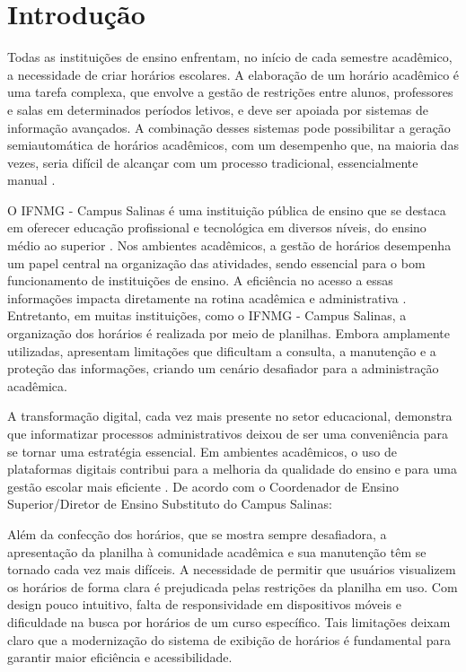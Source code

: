 \chapter{Introdução} 
\label{cap1_introducao} 

Todas as instituições de ensino enfrentam, no início de cada semestre acadêmico, a necessidade de criar horários escolares. A elaboração de um horário acadêmico é uma tarefa complexa, que envolve a gestão de restrições entre alunos, professores e salas em determinados períodos letivos, e deve ser apoiada por sistemas de informação avançados. A combinação desses sistemas pode possibilitar a geração semiautomática de horários acadêmicos, com um desempenho que, na maioria das vezes, seria difícil de alcançar com um processo tradicional, essencialmente manual \cite{passos2016}.

O IFNMG - Campus Salinas é uma instituição pública de ensino que se destaca em oferecer educação profissional e tecnológica em diversos níveis, do ensino médio ao superior \cite{ifnmgsalinas2014}. Nos ambientes acadêmicos, a gestão de horários desempenha um papel central na organização das atividades, sendo essencial para o bom funcionamento de instituições de ensino. A eficiência no acesso a essas informações impacta diretamente na rotina acadêmica e administrativa \cite{Urania2024}. Entretanto, em muitas instituições, como o IFNMG - Campus Salinas, a organização dos horários é realizada por meio de planilhas. Embora amplamente utilizadas, apresentam limitações que dificultam a consulta, a manutenção e a proteção das informações, criando um cenário desafiador para a administração acadêmica.

A transformação digital, cada vez mais presente no setor educacional, demonstra que informatizar processos administrativos deixou de ser uma conveniência para se tornar uma estratégia essencial. Em ambientes acadêmicos, o uso de plataformas digitais contribui para a melhoria da qualidade do ensino e para uma gestão escolar mais eficiente \cite{Educacional2023}. De acordo com o Coordenador de Ensino Superior/Diretor de Ensino Substituto do Campus Salinas:

\begin{citacao}
Além da confecção dos horários, que se mostra sempre desafiadora, a apresentação da planilha à comunidade acadêmica e sua manutenção têm se tornado cada vez mais difíceis. A necessidade de permitir que usuários visualizem os horários de forma clara é prejudicada pelas restrições da planilha em uso. Com design pouco intuitivo, falta de responsividade em dispositivos móveis e dificuldade na busca por horários de um curso específico. Tais limitações deixam claro que a modernização do sistema de exibição de horários é fundamental para garantir maior eficiência e acessibilidade.
\end{citacao}

